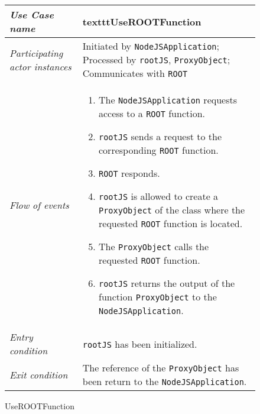 \begin{figure}[htb]
	\centering
	\begin{longtable}{p{3cm} @{\hskip 1cm} p{12cm}}
		\hline
		
		\textit{Use Case name} & texttt{UseROOTFunction}\\
		\hline
		
		\textit{Participating actor instances} & Initiated by \texttt{NodeJSApplication};
                Processed by \texttt{rootJS}, \texttt{ProxyObject};
                Communicates with \texttt{ROOT}\\
		\hline
		
		\textit{Flow of events} &
			\begin{enumerate}
				\item The \texttt{NodeJSApplication}  requests access to a \texttt{ROOT} function.
				
				\item \texttt{rootJS} sends a request to the corresponding \texttt{ROOT} function.
				
				\item \texttt{ROOT} responds.
				
				\item \texttt{rootJS} is allowed to create a \texttt{ProxyObject} of the class where the requested \texttt{ROOT} function is located.
				
				\item The \texttt{ProxyObject} calls the requested \texttt{ROOT} function.
				
				\item \texttt{rootJS} returns the output of the function \texttt{ProxyObject} to the \texttt{NodeJSApplication}.
			\end{enumerate}
			\\
		\hline
		
		\textit{Entry condition} & \texttt{rootJS} has been initialized.\\
		\hline
		
		\textit{Exit condition} & The reference of the \texttt{ProxyObject} has been return to the \texttt{NodeJSApplication}.\\
        \hline
	\end{longtable}
	
	\caption{UseROOTFunction}
\end{figure}

